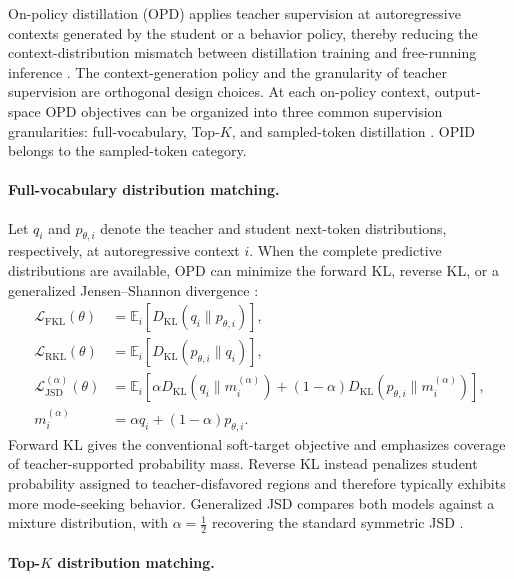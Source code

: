 \documentclass{llmxive}
\begin{document}
On-policy distillation (OPD) applies teacher supervision at autoregressive
contexts generated by the student or a behavior policy, thereby reducing the
context-distribution mismatch between distillation training and free-running
inference \citep{agarwal2024onpolicy}. The context-generation policy and the
granularity of teacher supervision are orthogonal design choices. At each
on-policy context, output-space OPD objectives can be organized into three
common supervision granularities: full-vocabulary, Top-$K$, and sampled-token
distillation \citep{li2026rethinkingopd,fu2026revisitingopd}. OPID belongs to
the sampled-token category.

\paragraph{Full-vocabulary distribution matching.}

Let \(q_i\) and \(p_{\theta,i}\) denote the teacher and student next-token
distributions, respectively, at autoregressive context \(i\). When the complete
predictive distributions are available, OPD can minimize the forward KL,
reverse KL, or a generalized Jensen--Shannon divergence
\citep{hinton2015distilling,agarwal2024onpolicy,gu2024minillm}:
\begin{equation*}
\begin{aligned}
 \mathcal L_{\mathrm{FKL}}(\theta)
 &=
 \mathbb E_i\!\left[
 D_{\mathrm{KL}}(q_i\|p_{\theta,i})
 \right],\\
 \mathcal L_{\mathrm{RKL}}(\theta)
 &=
 \mathbb E_i\!\left[
 D_{\mathrm{KL}}(p_{\theta,i}\|q_i)
 \right],\\
 \mathcal L_{\mathrm{JSD}}^{(\alpha)}(\theta)
 &=
 \mathbb E_i\!\left[
 \alpha D_{\mathrm{KL}}(q_i\|m_i^{(\alpha)})
 +(1-\alpha)D_{\mathrm{KL}}(p_{\theta,i}\|m_i^{(\alpha)})
 \right],\\
 m_i^{(\alpha)}
 &=
 \alpha q_i+(1-\alpha)p_{\theta,i}.
\end{aligned}
\end{equation*}
Forward KL gives the conventional soft-target objective and emphasizes
coverage of teacher-supported probability mass. Reverse KL instead penalizes
student probability assigned to teacher-disfavored regions and therefore
typically exhibits more mode-seeking behavior. Generalized JSD compares both
models against a mixture distribution, with \(\alpha=\tfrac12\) recovering
the standard symmetric JSD \citep{kullback1951information,lin1991divergence}.

\paragraph{Top-\texorpdfstring{\(K\)}{K} distribution matching.}
\end{document}
